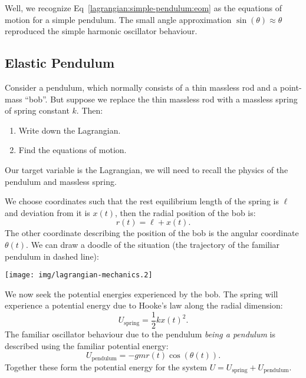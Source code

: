 Well, we recognize Eq~\eqref{lagrangian:simple-pendulum:eom}
as the equations of motion for a simple pendulum. The small angle
approximation $\sin(\theta)\approx\theta$ reproduced the simple harmonic
oscillator behaviour.

\subsection{Elastic Pendulum}

Consider a pendulum, which normally consists of a thin massless rod and
a point-mass ``bob''. But suppose we replace the thin massless rod with
a massless spring of spring constant $k$. Then:
\begin{enumerate}
\item Write down the Lagrangian.
\item Find the equations of motion.
\end{enumerate}

Our target variable is the Lagrangian, we will need to recall the
physics of the pendulum and massless spring.

We choose coordinates such that the rest equilibrium length of the
spring is $\ell$ and deviation from it is $x(t)$, then the radial
position of the bob is:
\begin{equation}
r(t) = \ell + x(t).
\end{equation}
The other coordinate describing the position of the bob is the angular
coordinate $\theta(t)$. We can draw a doodle of the situation (the
trajectory of the familiar pendulum in dashed line):

\begin{center}
\texttt{[image: img/lagrangian-mechanics.2]}
\end{center}

We now seek the potential energies experienced by the bob.
The spring will experience a potential energy due to Hooke's law along
the radial dimension: 
\begin{equation}
U_{\text{spring}} = \frac{1}{2}kx(t)^{2}.
\end{equation}
The familiar oscillator behaviour due to the pendulum \emph{being a pendulum}
is described using the familiar potential energy:
\begin{equation}
U_{\text{pendulum}} = -gmr(t)\cos(\theta(t)).
\end{equation}
Together these form the potential energy for the system
$U = U_{\text{spring}} + U_{\text{pendulum}}$.

